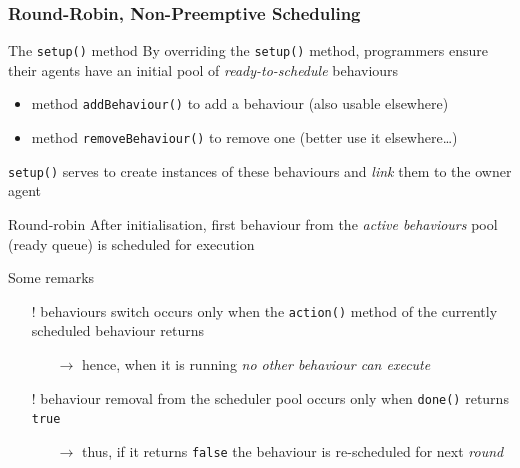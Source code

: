 \documentclass{beamer}\mode<presentation>{\usetheme{AMSCesenaPurpleAndGold}}
\begin{document}
\begin{frame}[c,allowframebreaks]\frametitle{Round-Robin, Non-Preemptive Scheduling}
    \begin{block}{The \texttt{setup()} method}
        By overriding the \texttt{setup()} method, \jade{} programmers ensure their agents have an initial pool of \emph{ready-to-schedule} behaviours
        \begin{itemize}
            \item method \texttt{addBehaviour()} to add a behaviour (also usable elsewhere)
            \item method \texttt{removeBehaviour()} to remove one (better use it elsewhere\ldots)
        \end{itemize}
        \texttt{setup()} serves to create instances of these behaviours and \emph{link} them to the owner agent
    \end{block}
    \begin{block}{Round-robin}
        After initialisation, first behaviour from the \emph{active behaviours} pool (\alert{ready queue}) is scheduled for execution
    \end{block}
    \begin{block}{Some remarks}
        \begin{itemize}
            \item[!] behaviours switch occurs only when the \texttt{action()} method of the currently scheduled behaviour returns
            \begin{itemize}
                \item[$\rightarrow$] hence, when it is running \emph{no other behaviour can execute}
            \end{itemize}
            \item[!] behaviour removal from the scheduler pool occurs only when \texttt{done()} returns \texttt{true}
            \begin{itemize}
                \item[$\rightarrow$] thus, if it returns \texttt{false} the behaviour is re-scheduled for next \emph{round}

\end{itemize}
\end{itemize}
\end{block}
\end{frame}
\end{document}
